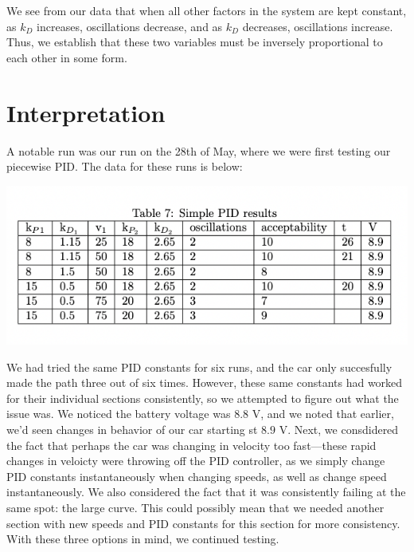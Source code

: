 \documentclass[12pt]{article}
\begin{document}
\begin{multicols}{2}
We see from our data that when all other factors in the system are kept constant,
as $k_D$ increases, oscillations decrease, and as $k_D$ decreases, oscillations increase. Thus, we establish that these two variables must be inversely proportional to each other in some form.


\section*{Interpretation}
A notable run was our run on the 28th of May, where we were first testing our piecewise PID. The data for these runs is below:
\begin{center}
    \includegraphics*[scale=0.5]{Table7.png}
\end{center}
We had tried the same PID constants for six runs, and the car only succesfully made the path three out of six times. However, these same constants had worked for their individual sections consistently,
so we attempted to figure out what the issue was. We noticed the battery voltage was $8.8$ V, and we noted that earlier, we'd seen changes in behavior of our car starting st $8.9$ V. 
Next, we consdidered the fact that perhaps the car was changing in velocity too fast—these rapid changes in veloicty were throwing off the PID controller, as we simply change PID constants instantaneously when
changing speeds, as well as change speed instantaneously. We also considered the fact that it was consistently failing at the same spot: the large curve. This could possibly mean that we needed another section with
new speeds and PID constants for this section for more consistency. With these three options in mind, we continued testing. 


\end{multicols}
\end{document}
